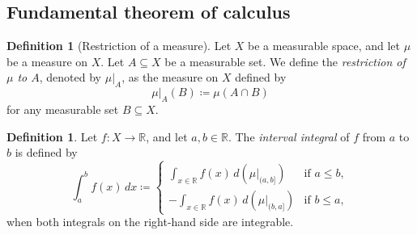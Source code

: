 \documentclass{article}
\theoremstyle{definition}
\newtheorem{definition}[theorem]{Definition}
\begin{document}
\subsection{Fundamental theorem of calculus}

\begin{definition}[Restriction of a measure]
  Let $X$ be a measurable space, and let $\mu$ be a measure on $X$.
  Let $A \subseteq X$ be a measurable set.
  We define the \emph{restriction of $\mu$ to $A$}, denoted by
  $\mu|_A$, as the measure on $X$ defined by
  \begin{equation*}
    \mu|_A (B) \coloneqq \mu (A \cap B)
  \end{equation*}
  for any measurable set $B \subseteq X$.
\end{definition}


\begin{definition}\label{ex:integral on interval}
  Let $f : X \to \mathbb{R}$, and 
  let $a, b \in \mathbb{R}$.
  The \emph{interval integral} of $f$ 
  from $a$ to $b$ is defined by
  \begin{equation*}
    \int_a^b f (x) \, dx 
      \coloneqq 
    \begin{cases}
      \displaystyle
      \int_{x \in \mathbb{R}} f (x) \, d(\mu|_{(a, b]}) & \text{if $a \leq b$}, \\[1em]
      \displaystyle
      - \int_{x \in \mathbb{R}} f (x) \, d(\mu|_{(b, a]}) & \text{if $b \leq a$},
    \end{cases}
  \end{equation*}
  when both integrals on the right-hand side are integrable.
\end{definition}
\end{document}
